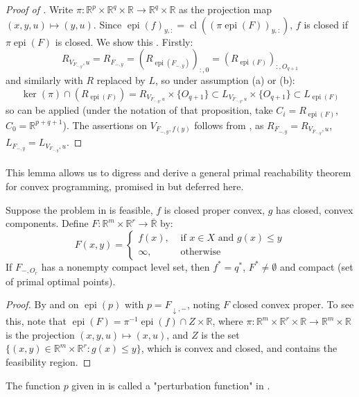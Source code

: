 \begin{proof}[Proof of ]
	Write $\pi:\mathbb{R}^p\times\mathbb{R}^q\times\mathbb{R}\to\mathbb{R}^q\times\mathbb{R}$ as the projection map $(x,y,u)\mapsto(y,u)$. Since $\operatorname{epi}(f)_{y,:}=\operatorname{cl}((\pi\operatorname{epi}(F))_{y,:})$, $f$ is closed if $\pi\operatorname{epi}(F)$ is closed. We show this . Firstly:
	\[
		R_{V_{F_{-,y}},u}=R_{F_{-,y}}=\left(R_{\operatorname{epi}(F_{-,y})}\right)_{:,0}=\left(R_{\operatorname{epi}(F)}\right)_{:,O_{q+1}}
	\]
	and similarly with $R$ replaced by $L$, so under assumption (a) or (b):
	\[
		\operatorname{ker}(\pi)\cap\left(R_{\operatorname{epi}(F)}\right)=R_{V_{F_{-,y},u}}\times \{O_{q+1}\}\subset
		L_{V_{F_{-,y},u}}\times\{O_{q+1}\}\subset L_{\operatorname{epi}(F)}
	\]
	so  can be applied (under the notation of that proposition, take $C_i=R_{\operatorname{epi}(F)}$, $C_0=\mathbb{R}^{p+q+1}$). The assertions on $V_{F_{-,y},f(y)}$ follows from , as $R_{F_{-,y}}=R_{V_{F_{-,y}},u}$, $L_{F_{-,y}}=L_{V_{F_{-,y}},u}$.
\end{proof}

\paragraph{}This lemma allows us to digress and derive a general primal reachability theorem for convex programming, promised in  but deferred here.

\begin{coro}\label{coro:047-convex-programming-primal-reachability}
	Suppose the problem in  is feasible, $f$ is closed proper convex, $g$ has closed, convex components. Define $F:\mathbb{R}^m\times \mathbb{R}^r\to \overline{\mathbb{R}}$ by:
	\[
		F(x,y)=
		\begin{cases}
			f(x),   & \text{ if }x\in X\text{ and }g(x)\leq y \\
			\infty, & \text{ otherwise}
		\end{cases}
	\]
	If $F_{-,O_r}$ has a nonempty compact level set, then $f^\ast=q^\ast$, $F^\ast\neq\emptyset$ and compact (set of primal optimal points).
\end{coro}

\begin{proof}
	By  and  on $\operatorname{epi}(p)$ with $p=F_{\downarrow,-}$, noting $F$ closed convex proper. To see this, note that $\operatorname{epi}(F)=\pi^{-1}\operatorname{epi}(f)\cap Z\times \mathbb{R}$, where $\pi:\mathbb{R}^m\times \mathbb{R}^r\times \mathbb{R}\to \mathbb{R}^m\times \mathbb{R}$ is the projection $(x,y,u)\mapsto (x,u)$, and $Z$ is the set $\{(x,y)\in \mathbb{R}^m\times \mathbb{R}^r:g(x)\leq y\}$, which is convex and closed, and contains the feasibility region.
\end{proof}

\begin{rmrk}[Perturbation]
	The function $p$ given in  is called a "perturbation function" in \cite{bertsekas2009convex}.
\end{rmrk}

